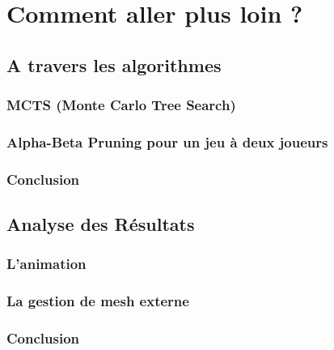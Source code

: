 \section{Comment aller plus loin ?}

\subsection{A travers les algorithmes }
\subsubsection{MCTS (Monte Carlo Tree Search)}
\subsubsection{Alpha-Beta Pruning pour un jeu à deux joueurs}
\subsubsection{Conclusion}

\subsection{Analyse des Résultats}
\subsubsection{L'animation}
\subsubsection{La gestion de mesh externe}
\subsubsection{Conclusion}